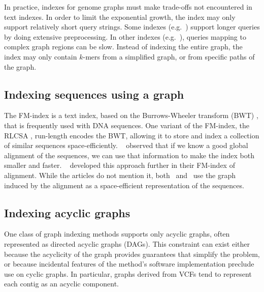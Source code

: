 In practice, indexes for genome graphs must make trade-offs not encountered in text indexes.
In order to limit the exponential growth, the index may only support relatively short query strings.
Some indexes (e.g.\ \cite{Siren_2014}) support longer queries by doing extensive preprocessing.
In other indexes (e.g.\ \cite{Thachuk_2013,Huang_2013,Maciuca_2016}), queries mapping to complex graph regions can be slow.
Instead of indexing the entire graph, the index may only contain $k$-mers from a simplified graph, or from specific paths of the graph.

\subsection{Indexing sequences using a graph}

The FM-index \cite{Ferragina_2005} is a text index, based on the Burrows-Wheeler transform (BWT) \cite{Burrows_1994}, that is frequently used with DNA sequences.
One variant of the FM-index, the RLCSA \cite{Maekinen_2010}, run-length encodes the BWT, allowing it to store and index a collection of similar sequences space-efficiently.
\citeauthor{Huang_2010}\ \cite{Huang_2010} observed that if we know a good global alignment of the sequences, we can use that information to make the index both smaller and faster.
\citeauthor{Na_2016}\ \cite{Na_2016,Na_2018} developed this approach further in their FM-index of alignment.
While the articles do not mention it, both \citeauthor{Huang_2010}\ and \citeauthor{Na_2016}\ use the graph induced by the alignment as a space-efficient representation of the sequences.

\subsection{Indexing acyclic graphs}

One class of graph indexing methods supports only acyclic graphs, often represented as directed acyclic graphs (DAGs).
This constraint can exist either because the acyclicity of the graph provides guarantees that simplify the problem, or because incidental features of the method's software implementation preclude use on cyclic graphs.
In particular, graphs derived from VCFs tend to represent each contig as an acyclic component.
 
